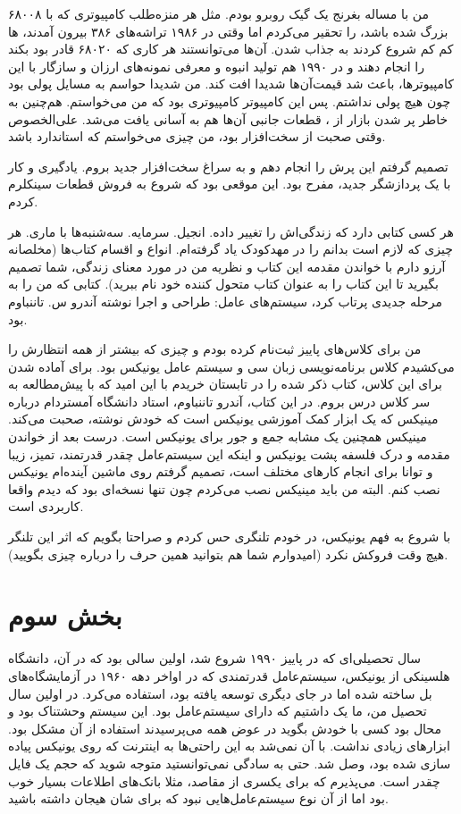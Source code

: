 من با مساله بغرنج یک گیک روبرو بودم. مثل هر منزه‌طلب کامپیوتری که با
۶۸۰۰۸ بزرگ شده باشد،  را تحقیر می‌کردم اما وقتی در ۱۹۸۶ تراشه‌های
۳۸۶ بیرون آمدند، ها کم کم شروع کردند به جذاب شدن. آن‌ها
می‌توانستند هر کاری که ۶۸۰۲۰ قادر بود بکند را انجام دهند و در ۱۹۹۰ هم
تولید انبوه و معرفی نمونه‌های ارزان و سازگار با این کامپیوترها، باعث شد
قیمت‌آن‌ها شدیدا افت کند. من شدیدا حواسم به مسایل پولی بود چون هیچ پولی
نداشتم. پس این کامپیوتر کامپیوتری بود که من می‌خواستم. هم‌چنین به خاطر
پر شدن بازار از ، قطعات جانبی آن‌ها هم به آسانی یافت
می‌شد. علی‌الخصوص وقتی صحبت از سخت‌افزار بود، من چیزی می‌خواستم که
استاندارد باشد.

تصمیم گرفتم این پرش را انجام دهم و به سراغ سخت‌افزار جدید بروم. یادگیری
و کار با یک پردازشگر جدید، مفرح بود. این موقعی بود که شروع به فروش
قطعات سینکلرم کردم.

هر کسی کتابی دارد که زندگی‌اش را تغییر داده. انجیل. سرمایه. سه‌شنبه‌ها با
ماری. هر چیزی که لازم است بدانم را در مهدکودک یاد گرفته‌ام. انواع و
اقسام کتا‌ب‌ها (مخلصانه آرزو دارم با خواندن مقدمه این کتاب و نظریه من در
مورد معنای زندگی، شما تصمیم بگیرید تا این کتاب را به عنوان کتاب متحول
کننده خود نام ببرید). کتابی که من را به مرحله جدیدی پرتاب کرد،
سیستم‌های عامل: طراحی و اجرا نوشته آندرو
س. تاننباوم بود.

من برای کلاس‌های پاییز ثبت‌نام کرده بودم و چیزی که بیشتر از همه انتظارش
را می‌کشیدم کلاس برنامه‌نویسی زبان سی و سیستم عامل یونیکس بود. برای
آماده شدن برای این کلاس‌، کتاب ذکر شده را در تابستان خریدم با این امید
که با پیش‌‌مطالعه به سر کلاس درس بروم. در این کتاب، آندرو تاننباوم،
استاد دانشگاه آمستردام درباره مینیکس که یک ابزار کمک
آموزشی یونیکس است که خودش نوشته، صحبت می‌کند. مینیکس همچنین یک مشابه
جمع و جور برای یونیکس است. درست بعد از خواندن مقدمه و درک فلسفه پشت
یونیکس و اینکه این سیستم‌عامل چقدر قدرتمند، تمیز، زیبا و توانا برای
انجام کارهای مختلف است، تصمیم گرفتم روی ماشین آینده‌ام یونیکس نصب
کنم. البته من باید مینیکس نصب می‌کردم چون تنها نسخه‌ای بود که دیدم واقعا
کاربردی است.

با شروع به فهم یونیکس، در خودم تلنگری حس کردم و صراحتا بگویم که اثر
این تلنگر هیچ وقت فروکش نکرد (امیدوارم شما هم بتوانید همین حرف‌ را
درباره چیزی بگویید).

\section{بخش سوم}
سال تحصیلی‌ای که در پاییز ۱۹۹۰ شروع شد، اولین سالی بود که در آن،
دانشگاه هلسینکی از یونیکس، سیستم‌عامل قدرتمندی که در اواخر دهه ۱۹۶۰ در
آزمایشگاه‌های بل ساخته شده اما در جای دیگری توسعه یافته بود، استفاده
می‌کرد. در اولین سال تحصیل من، ما یک  داشتیم که دارای سیستم‌عامل
 بود. این سیستم وحشتناک بود و محال بود کسی با خودش بگوید
 در عوض همه
می‌پرسیدند  استفاده
از آن مشکل بود. ابزارهای زیادی نداشت. با آن نمی‌شد به این راحتی‌ها به
اینترنت که روی یونیکس پیاده سازی شده بود، وصل شد. حتی به سادگی
نمی‌توانستید متوجه شوید که حجم یک فایل چقدر است. می‌پذیرم که 
برای یکسری از مقاصد، مثلا بانک‌های اطلاعات بسیار خوب بود اما از آن نوع
سیستم‌عامل‌هایی نبود که برای شان هیجان داشته باشید.

